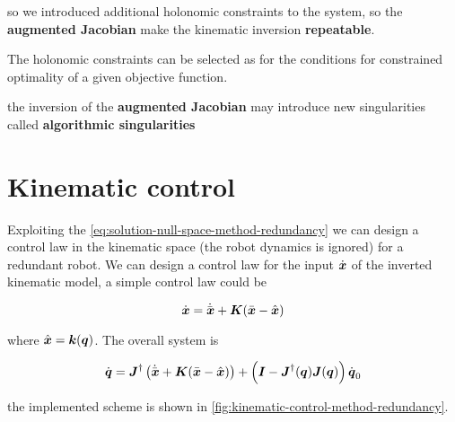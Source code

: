 so we introduced additional holonomic constraints to the system, so the \textbf{augmented Jacobian} make the kinematic inversion \textbf{repeatable}.

The holonomic constraints can be selected as for the conditions for constrained optimality of a given objective function.

\begin{nb}the inversion of the \textbf{augmented Jacobian} may introduce new singularities called \textbf{algorithmic singularities}\end{nb}

\section{Kinematic control}

Exploiting the \autoref{eq:solution-null-space-method-redundancy} we can design a control law in the kinematic space (the robot dynamics is ignored) for a redundant robot.
We can design a control law for the input $\dot{\boldsymbol{x}}$ of the inverted kinematic model, a simple control law could be

\[
	\dot{\boldsymbol{x}} = \dot{\bar{\boldsymbol{x}}} + \boldsymbol{K} (\bar{\boldsymbol{x}} - \hat{\boldsymbol{x}})
\]

where $\hat{\boldsymbol{x}} = \boldsymbol{k}(\boldsymbol{q})$.
The overall system is

\[
	\dot{\boldsymbol{q}} = \boldsymbol{J}^\dag \left( \dot{\bar{\boldsymbol{x}}} + \boldsymbol{K} (\bar{\boldsymbol{x}} - \hat{\boldsymbol{x}}) \right) + \left( \boldsymbol{I} - \boldsymbol{J}^\dag(\boldsymbol{q}) \boldsymbol{J}(\boldsymbol{q}) \right) \dot{\boldsymbol{q}}_0
\]

the implemented scheme is shown in \autoref{fig:kinematic-control-method-redundancy}.

